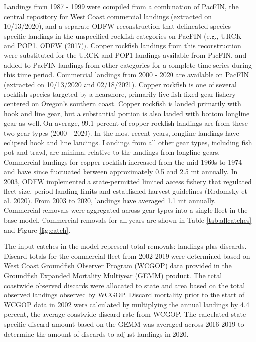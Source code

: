 \documentclass[11pt,
  english,
  a4paper,
]{article}
\begin{document}
\leavevmode\tagmcend\tagstructend\par


Landings from 1987 - 1999 were compiled from a combination of PacFIN, the central repository for West Coast commercial landings (extracted on 10/13/2020), and a separate ODFW reconstruction that delineated species-specific landings in the unspecified rockfish categories on PacFIN (e.g., URCK and POP1, ODFW {(2017)\leavevmode\tagmcend\tagstructend}). Copper rockfish landings from this reconstruction were substituted for the URCK and POP1 landings available from PacFIN, and added to PacFIN landings from other categories for a complete time series during this time period. Commercial landings from 2000 - 2020 are available on PacFIN (extracted on 10/13/2020 and 02/18/2021). Copper rockfish is one of several rockfish species targeted by a nearshore, primarily live-fish fixed gear fishery centered on Oregon's southern coast. Copper rockfish is landed primarily with hook and line gear, but a substantial portion is also landed with bottom longline gear as well. On average, 99.1 percent of copper rockfish landings are from these two gear types (2000 - 2020). In the most recent years, longline landings have eclipsed hook and line landings. Landings from all other gear types, including fish pot and trawl, are minimal relative to the landings from longline gears. Commercial landings for copper rockfish increased from the mid-1960s to 1974 and have since fluctuated between approximately 0.5 and 2.5 mt annually. In 2003, ODFW implemented a state-permitted limited access fishery that regulated fleet size, period landing limits and established harvest guidelines {(Rodomsky et al. 2020)\leavevmode\tagmcend\tagstructend}. From 2003 to 2020, landings have averaged 1.1 mt annually. Commercial removals were aggregated across gear types into a single fleet in the base model. Commercial removals for all years are shown in Table \ref{tab:allcatches} and Figure \ref{fig:catch}.

\leavevmode\tagmcend\tagstructend\par


The input catches in the model represent total removals: landings plus discards. Discard totals for the commercial fleet from 2002-2019 were determined based on West Coast Groundfish Observer Program (WCGOP) data provided in the Groundfish Expanded Mortality Multiyear (GEMM) product. The total coastwide observed discards were allocated to state and area based on the total observed landings observed by WCGOP. Discard mortality prior to the start of WCGOP data in 2002 were calculated by multiplying the annual landings by 4.4 percent, the average coastwide discard rate from WCGOP. The calculated state-specific discard amount based on the GEMM was averaged across 2016-2019 to determine the amount of discards to adjust landings in 2020.
\end{document}
